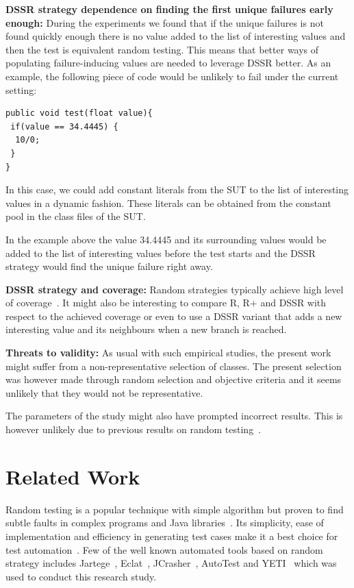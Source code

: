 \documentclass{acm_proc_article-sp}
\begin{document}
\textbf{DSSR strategy dependence on finding the first unique failures early enough:}
During the experiments we found that if the unique failures is not found  quickly enough there is no value added to the list of interesting values and then the test is equivalent random testing. This means that better ways of populating failure-inducing values are needed to leverage DSSR better. As an example, the following piece of code would be unlikely to fail under the current setting:

\begin{lstlisting}
public void test(float value){
 if(value == 34.4445) { 
  10/0; 
 }
}
\end{lstlisting}

In this case, we could add constant literals from the SUT to the list of interesting values in a dynamic fashion. These literals can be obtained from the constant pool in the class files of the SUT.

In the example above the value 34.4445 and its surrounding values would  be added to the list of interesting values before the test starts and the DSSR strategy would find the unique failure right away.

\textbf{DSSR strategy and coverage:} Random strategies typically achieve high level of coverage~\cite{Oriol2010}. It might also be interesting to compare R, R+ and DSSR with respect to the achieved coverage or even to use a DSSR variant that adds a new interesting value and its neighbours when a new branch is reached.


\textbf{Threats to validity:} As usual with such empirical studies, the present work might suffer from a non-representative selection of classes.
The present selection was however made through random selection and objective criteria and it seems unlikely that they would not be representative.

The parameters of the study might also have prompted incorrect results. This is however unlikely due to previous results on random testing~\cite{Oriol2012}.




\section{Related Work}\label{sec:rw}

Random testing is a popular technique with simple algorithm but proven to find subtle faults in complex programs and Java libraries~\cite{Pacheco2005, Csallner2004, Claessen2000a}. Its simplicity, ease of implementation and efficiency in generating test cases make it a best choice for test automation~\cite{Hamlet1994}. Few of the well known automated tools based on random strategy includes Jartege~\cite{Oriat2004}, Eclat~\cite{Pacheco2005}, JCrasher~\cite{Csallner2004}, AutoTest \cite{Ciupa2007, Ciupa2008a} and YETI~\cite{Oriol2010, Oriol2012}  which was used to conduct this research study.
\end{document}
